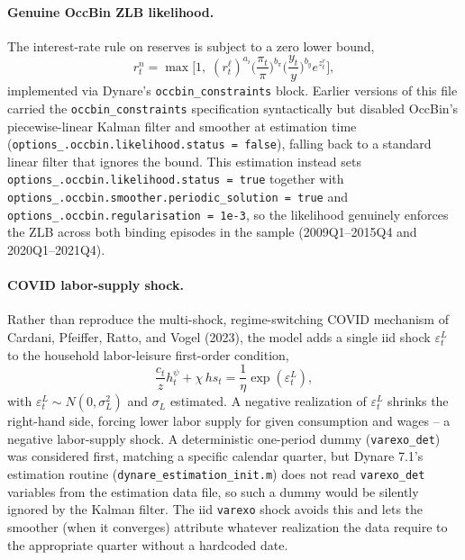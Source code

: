 \documentclass[11pt]{article}
\begin{document}
\paragraph{Genuine OccBin ZLB likelihood.} The interest-rate rule on
reserves is subject to a zero lower bound,
\[
r^n_t = \max\!\Big[1,\; (r^{\ell}_t)^{a_i}\Big(\frac{\pi_t}{\pi}\Big)^{b_\pi}
\Big(\frac{y_t}{y}\Big)^{b_y} e^{z^r_t}\Big],
\]
implemented via Dynare's \texttt{occbin\_constraints} block. Earlier
versions of this file carried the \texttt{occbin\_constraints}
specification syntactically but disabled OccBin's piecewise-linear
Kalman filter and smoother at estimation time
(\texttt{options\_.occbin.likelihood.status = false}), falling back to a
standard linear filter that ignores the bound. This estimation instead
sets \texttt{options\_.occbin.likelihood.status = true} together with
\texttt{options\_.occbin.smoother.periodic\_solution = true} and
\texttt{options\_.occbin.regularisation = 1e{-}3}, so the likelihood
genuinely enforces the ZLB across both binding episodes in the sample
(2009Q1--2015Q4 and 2020Q1--2021Q4).

\paragraph{COVID labor-supply shock.} Rather than reproduce the
multi-shock, regime-switching COVID mechanism of Cardani, Pfeiffer,
Ratto, and Vogel (2023), the model adds a single iid shock $\varepsilon^L_t$
to the household labor-leisure first-order condition,
\[
\frac{c_t}{z}h_t^{\psi} + \chi\, hs_t = \frac{1}{\eta}\exp(\varepsilon^L_t),
\]
with $\varepsilon^L_t \sim N(0,\sigma_L^2)$ and $\sigma_L$ estimated. A
negative realization of $\varepsilon^L_t$ shrinks the right-hand side,
forcing lower labor supply for given consumption and wages -- a negative
labor-supply shock. A deterministic one-period dummy
(\texttt{varexo\_det}) was considered first, matching a specific
calendar quarter, but Dynare 7.1's estimation routine
(\texttt{dynare\_estimation\_init.m}) does not read \texttt{varexo\_det}
variables from the estimation data file, so such a dummy would be
silently ignored by the Kalman filter. The iid \texttt{varexo} shock
avoids this and lets the smoother (when it converges) attribute
whatever realization the data require to the appropriate quarter without
a hardcoded date.
\end{document}

